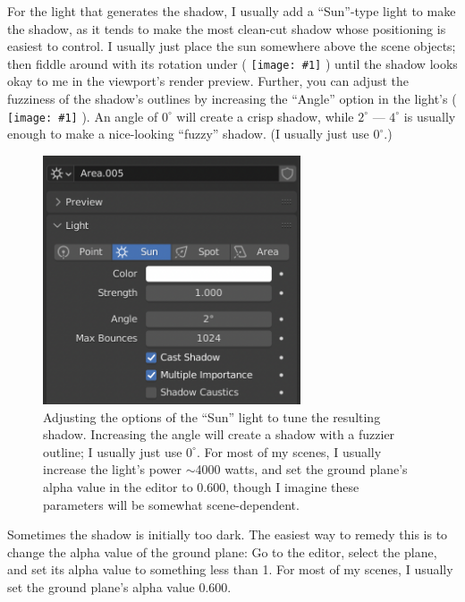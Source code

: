 \documentclass[10pt]{article}
\DeclareRobustCommand{\inlinepic}[1]{%
  \begingroup\normalfont
  \texttt{[image: \#1]}%
  \endgroup
}
\begin{document}
For the light that generates the shadow, I usually add a ``Sun''-type light to make the shadow, as it tends to make the most clean-cut shadow whose positioning is easiest to control. I usually just place the sun somewhere above the scene objects; then fiddle around with its rotation under  (\inlinepic{images/object-properties-icon.png}) until the shadow looks okay to me in the viewport's render preview. Further, you can adjust the fuzziness of the shadow's outlines by increasing the ``Angle'' option in the light's  (\inlinepic{images/object-data-properties-light.png}). An angle of $0^\circ$ will create a crisp shadow, while $2^\circ$ --- $4^\circ$ is usually enough to make a nice-looking ``fuzzy'' shadow. (I usually just use $0^\circ$.)
\begin{figure}[H]
    \centering
    \captionsetup{width=0.8\textwidth}
    \includegraphics[width=3in]{images/sun-options.png}
    \caption{Adjusting the options of the ``Sun'' light to tune the resulting shadow. Increasing the angle will create a shadow with a fuzzier outline; I usually just use $0^\circ$. For most of my scenes, I usually increase the light's power $\sim$4000 watts, and set the ground plane's alpha value in the  editor to 0.600, though I imagine these parameters will be somewhat scene-dependent.}
    \label{fig:sun-options}
\end{figure}
Sometimes the shadow is initially too dark. The easiest way to remedy this is to change the alpha value of the ground plane: Go to the  editor, select the plane, and set its alpha value to something less than 1. For most of my scenes, I usually set the ground plane's alpha value 0.600.
\end{document}
